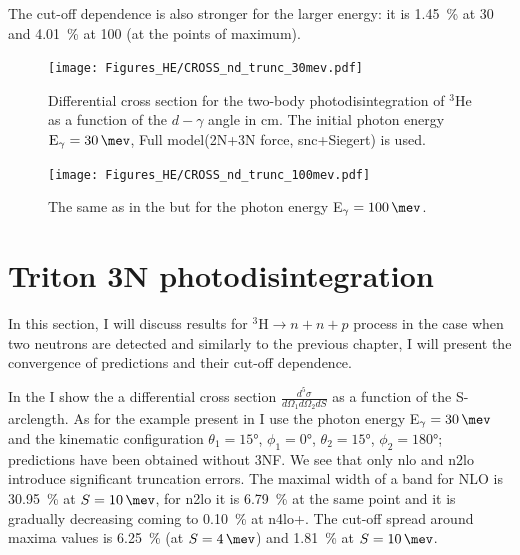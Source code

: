     The cut-off dependence is also stronger for the larger energy:
    it is  \SI{1.45}{\percent} at \SI{30}{\mev} and \SI{4.01}{\percent} at \SI{100}{\mev}
    (at the points of maximum). 

\begin{figure}[h]
    \begin{center}
        \texttt{[image: Figures\_HE/CROSS\_nd\_trunc\_30mev.pdf]}
        \end{center}
        \caption{Differential cross section for the
        two-body photodisintegration of $^3$He as a function of the $d-\gamma$ angle in \gls{cm}.
        The initial photon energy $\text{E}_\gamma=\SI{30}{\mev}$, 
        Full model(2N+3N force, \gls{snc}+Siegert) is used.}
        \label{CROSS_nd_30}
    \end{figure}


    \begin{figure}[h]
        \begin{center}
        \texttt{[image: Figures\_HE/CROSS\_nd\_trunc\_100mev.pdf]}
        \end{center}
        \caption{The same as in the  but 
        for the photon energy E$_\gamma=\SI{100}{\mev}$.}
        \label{CROSS_nd_100}
    \end{figure}

    \clearpage
\section{Triton 3N photodisintegration}
    \label{sec:triton_results}
    
    
    In this section, I will discuss results for $^3\text{H} \rightarrow n + n + p$ process in the case when two neutrons are detected 
    and similarly to the previous chapter, I will present the convergence of predictions 
    and their cut-off dependence. 

    In the  I show the a differential cross section 
    $\frac{d^5\sigma}{d\Omega_1d\Omega_2dS}$ as a function of the S-arclength.
    As for the example present in  I use
    the photon energy E$_\gamma=\SI{30}{\mev}$ and the kinematic configuration
    $\theta_1 = \ang{15}$, $\phi_1 = \ang{0}$,
    $\theta_2 = \ang{15}$, $\phi_2 = \ang{180}$; predictions have been obtained without 3NF.
    We see that only \gls{nlo} and \gls{n2lo} introduce significant truncation errors.
    The maximal width of a band for NLO is \SI{30.95}{\percent} at $S=\SI{10}{\mev}$,
    for \gls{n2lo} it is \SI{6.79}{\percent} at the same point and it is gradually decreasing
    coming to \SI{0.10}{\percent} at \gls{n4lo+}.
    The cut-off spread around maxima values is \SI{6.25}{\percent} (at $S=\SI{4}{\mev}$) and 
    \SI{1.81}{\percent} at $S=\SI{10}{\mev}$.

